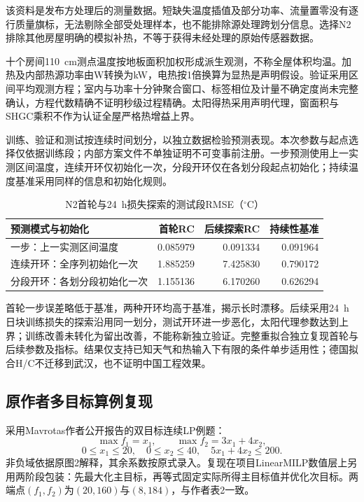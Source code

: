 该资料是发布方处理后的测量数据。短缺失温度插值及部分功率、流量置零没有逐行质量旗标，无法剔除全部受处理样本，也不能排除源处理跨划分信息。选择N2排除其他房屋明确的模拟补热，不等于获得未经处理的原始传感器数据。

十个房间110~cm测点温度按地板面积加权形成派生观测，不称全屋体积均温。加热及内部热源功率由W转换为kW，电热按1倍换算为显热是声明假设。验证采用区间平均观测方程；室内与功率十分钟聚合窗口、标签相位及计量不确定度尚未完整确认，方程代数精确不证明秒级过程精确。太阳得热采用声明代理，窗面积与SHGC乘积不作为认证全屋严格热增益上界。

训练、验证和测试按连续时间划分，以独立数据检验预测表现。本次参数与起点选择仅依据训练段；内部方案文件不单独证明不可变事前注册。一步预测使用上一实测区间温度，连续开环仅初始化一次，分段开环仅在各划分段起点初始化；持续温度基准采用同样的信息和初始化规则。

\begin{table}[H]
\centering
\caption{N2首轮与24~h损失探索的测试段RMSE（$^\circ$C）}
\begin{tabularx}{\textwidth}{@{}Xrrr@{}}
\toprule
预测模式与初始化 & 首轮RC & 后续探索RC & 持续性基准\\
\midrule
一步：上一实测区间温度 & 0.085979 & 0.091334 & 0.091964\\
连续开环：全序列初始化一次 & 1.885259 & 7.425830 & 0.790172\\
分段开环：各划分段初始化一次 & 1.155136 & 6.170260 & 0.626294\\
\bottomrule
\end{tabularx}
\end{table}

首轮一步误差略低于基准，两种开环均高于基准，揭示长时漂移。后续采用24~h日块训练损失的探索沿用同一划分，测试开环进一步恶化，太阳代理参数达到上界；训练改善未转化为留出改善，不能称新独立验证。完整重拟合独立复现首轮与后续参数及指标。结果仅支持已知天气和热输入下有限的条件单步适用性；德国拟合H/C不迁移到武汉，也不证明中国工程效果。

\clearpage
\subsection{原作者多目标算例复现}

采用Mavrotas作者公开报告的双目标连续LP例题：
\begin{equation}
\max f_1=x_1,\qquad \max f_2=3x_1+4x_2,
\end{equation}
\begin{equation}
0\leq x_1\leq20,\quad0\leq x_2\leq40,\quad5x_1+4x_2\leq200.
\end{equation}
非负域依据原图2解释，其余系数按原式录入。复现在项目LinearMILP数值层上另用两阶段包装：先最大化主目标，再等式固定实际所得主目标值并优化次目标。两端点$(f_1,f_2)$为$(20,160)$与$(8,184)$，与作者表2一致。

